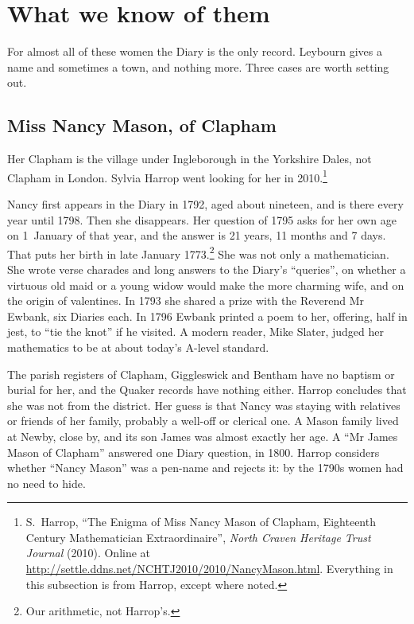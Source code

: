 \documentclass[11pt,a4paper]{article}
\begin{document}
\section*{What we know of them}

For almost all of these women the Diary is the only record. Leybourn gives a name and
sometimes a town, and nothing more. Three cases are worth setting out.

\subsection*{Miss Nancy Mason, of Clapham}

Her Clapham is the village under Ingleborough in the Yorkshire Dales, not Clapham in
London. Sylvia Harrop went looking for her in 2010.\footnote{S.~Harrop, ``The Enigma of
Miss Nancy Mason of Clapham, Eighteenth Century Mathematician Extraordinaire'',
\textit{North Craven Heritage Trust Journal} (2010). Online at
\url{http://settle.ddns.net/NCHTJ2010/2010/NancyMason.html}. Everything in this
subsection is from Harrop, except where noted.}

Nancy first appears in the Diary in 1792, aged about nineteen, and is there every year
until 1798. Then she disappears. Her question of 1795 asks for her own age on 1~January
of that year, and the answer is 21 years, 11 months and 7 days. That puts her birth
in late January 1773.\footnote{Our arithmetic, not Harrop's.} She was not only a
mathematician. She wrote verse charades and long answers to the Diary's ``queries'', on
whether a virtuous old maid or a young widow would make the more charming wife, and on
the origin of valentines. In 1793 she shared a prize with the Reverend Mr Ewbank, six
Diaries each. In 1796 Ewbank printed a poem to her, offering, half in jest, to ``tie the
knot'' if he visited. A modern reader, Mike Slater, judged her mathematics to be at
about today's A-level standard.

The parish registers of Clapham, Giggleswick and Bentham have no baptism or burial for
her, and the Quaker records have nothing either. Harrop concludes that she was not from
the district. Her guess is that Nancy was staying with relatives or friends of her
family, probably a well-off or clerical one. A Mason family lived at Newby, close by,
and its son James was almost exactly her age. A ``Mr James Mason of Clapham'' answered
one Diary question, in 1800. Harrop considers whether ``Nancy Mason'' was a pen-name and
rejects it: by the 1790s women had no need to hide.
\end{document}
